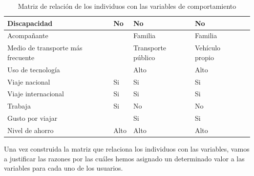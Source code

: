 \begin{table}[H]
\begin{tabular}{|p{10em}|p{7em}|p{7em}|p{7em}|p{8em}|}
        Discapacidad                      & No                                          & No                                            & No                                            \\ \hline
        Acompañante                       &                                             & Familia                                       & Familia                                       \\ \hline
        Medio de transporte más frecuente &                                             & Transporte público                            & Vehículo propio                               \\ \hline
        Uso de tecnología                 &                                             & Alto                                          & Alto                                          \\ \hline
        Viaje nacional                    & Si                                          & Si                                            & Si                                            \\ \hline
        Viaje internacional               & Si                                          & Si                                            & Si                                            \\ \hline
        Trabaja                           & Si                                          & No                                            & No                                            \\ \hline
        Gusto por viajar                  &                                             & Si                                            & Si                                            \\ \hline
        Nivel de ahorro                   & Alto                                        & Alto                                          & Alto                                          \\ \hline
    \end{tabular}
    \caption{Matriz de relación de los individuos con las variables de comportamiento}
    \label{table:relacion-individuos-variables}
\end{table}

Una vez construida la matriz que relaciona los individuos con las variables, vamos a justificar las razones por las cuáles hemos asignado un
determinado valor a las variables para cada uno de los usuarios. \\

